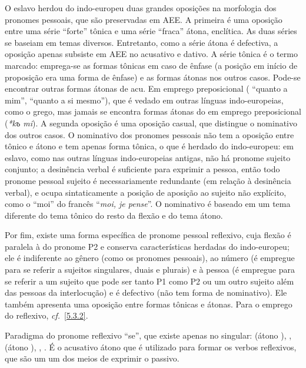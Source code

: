 O eslavo herdou do indo-europeu duas grandes oposições na morfologia dos
pronomes pessoais, que são preservadas em AEE\@. A primeira é uma oposição
entre uma série ``forte'' tônica e uma série ``fraca'' átona, enclítica.
As duas séries se baseiam em temas diversos. Entretanto, como a série
átona é defectiva, a oposição apenas subsiste em AEE no acusativo e
dativo. A série tônica é o termo marcado: emprega-se as formas tônicas
em caso de ênfase (a posição em início de proposição era uma forma de
ênfase) e as formas átonas nos outros casos. Pode-se encontrar outras
formas átonas de acu. Em emprego preposicional (
``quanto a mim'',  ``quanto a si mesmo''), que é
vedado em outras línguas indo-europeias, como o grego, mas jamais se
encontra formas átonas do  em emprego preposicional (\emph{*kъ
mi}). A segunda oposição é uma oposição casual, que distingue o
nominativo dos outros casos. O nominativo dos pronomes pessoais não tem
a oposição entre tônico e átono e tem apenas forma tônica, o que é
herdado do indo-europeu: em eslavo, como nas outras línguas
indo-europeias antigas, não há pronome sujeito conjunto; a desinência
verbal é suficiente para exprimir a pessoa, então todo pronome pessoal
sujeito é necessariamente redundante (em relação à desinência verbal), e
ocupa sintaticamente a posição de aposição ao sujeito não explícito,
como o ``moi'' do francês ``\emph{moi, je pense}''. O nominativo é
baseado em um tema diferente do tema tônico do resto da flexão e do tema
átono.

Por fim, existe uma forma específica de pronome pessoal reflexivo, cuja
flexão é paralela à do pronome P2 e conserva características herdadas do
indo-europeu; ele é indiferente ao gênero (como os pronomes pessoais),
ao número (é empregue para se referir a sujeitos singulares, duais e
plurais) e à pessoa (é empregue para se referir a um sujeito que pode
ser tanto P1 como P2 ou um outro sujeito além das pessoas da
interlocução) e é defectivo (não tem forma de nominativo). Ele também
apresenta uma oposição entre formas tônicas e átonas. Para o emprego do
reflexivo, \emph{cf.}~\ref{5.3.2}.



Paradigma do pronome reflexivo ``se'', que existe apenas no singular:
  (átono ), 
,   (átono ),
 ,  .
É o acusativo átono  que é utilizado para
formar os verbos reflexivos, que são um um dos meios de exprimir o
passivo.

